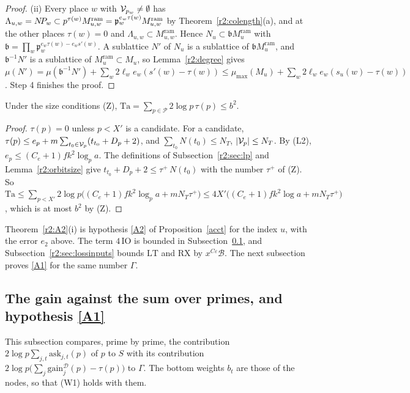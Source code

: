 \begin{proof}
(ii) Every place $w$ with $\mathcal V_{p_w}\ne\emptyset$ has $\Lambda_{u,w}=N\!P_w\subset p^{\tau(w)}M^{\mathrm{ram}}_{u,w}=\mathfrak p_w^{e_w\tau(w)}M^{\mathrm{ram}}_{u,w}$ by Theorem~\ref{r2:colength}(a), and at the other places $\tau(w)=0$ and $\Lambda_{u,w}\subset M^{\mathrm{ram}}_{u,w}$. Hence $N_u\subset\mathfrak bM^{\mathrm{ram}}_u$ with $\mathfrak b=\prod_w\mathfrak p_w^{e_w\tau(w)-e_ws'(w)}$. A sublattice $N'$ of $N_u$ is a sublattice of $\mathfrak bM^{\mathrm{ram}}_u$, and $\mathfrak b^{-1}N'$ is a sublattice of $M^{\mathrm{ram}}_u\subset M_u$, so Lemma~\ref{r2:degree} gives $\mu(N')=\mu(\mathfrak b^{-1}N')+\sum_w2\ell_we_w(s'(w)-\tau(w))\le\mu_{\max}(M_u)+\sum_w2\ell_we_w(s_u(w)-\tau(w))$. Step 4 finishes the proof.
\end{proof}

\begin{lemma}\label{r2:tau}
Under the size conditions (Z), $\mathrm{Ta}=\sum_{p\in\mathcal P}2\log p\,\tau(p)\le b^2$.
\end{lemma}

\begin{proof}
$\tau(p)=0$ unless $p<X'$ is a candidate. For a candidate, $\tau(p)\le e_p+m\sum_{t_0\in\mathcal V_p}(t_{t_0}+D_p+2)$, and $\sum_{t_0}N(t_0)\le N_T$, $\lvert\mathcal V_p\rvert\le N_T$. By (L2), $e_p\le(C_e+1)fk^2\log_pa$. The definitions of Subsection~\ref{r2:sec:lp} and Lemma~\ref{r2:orbitsize} give $t_{t_0}+D_p+2\le\tau^+\,N(t_0)$ with the number $\tau^+$ of (Z). So $\mathrm{Ta}\le\sum_{p<X'}2\log p\big((C_e+1)fk^2\log_pa+mN_T\tau^+\big)\le4X'\big((C_e+1)fk^2\log a+mN_T\tau^+\big)$, which is at most $b^2$ by (Z).
\end{proof}

Theorem~\ref{r2:A2}(i) is hypothesis \eqref{A2} of Proposition~\ref{acct} for the index $u$, with the error $e_2$ above. The term $4\,\mathrm{IO}$ is bounded in Subsection~\ref{r2:sec:gainprime}, and Subsection~\ref{r2:sec:lossinputs} bounds $\mathrm{LT}$ and $\mathrm{RX}$ by $x^{C\varepsilon}\mathcal B$. The next subsection proves \eqref{A1} for the same number $\Gamma$.
\subsection{The gain against the sum over primes, and hypothesis \texorpdfstring{\eqref{A1}}{(A1)}}\label{r2:sec:gainprime}

This subsection compares, prime by prime, the contribution $2\log p\sum_{j,t}\mathrm{ask}_{j,t}(p)$ of $p$ to $S$ with its contribution $2\log p\big(\sum_j\mathrm{gain}^{\mathcal D}_j(p)-\tau(p)\big)$ to $\Gamma$. The bottom weights $b_t$ are those of the nodes, so that (W1) holds with them.

